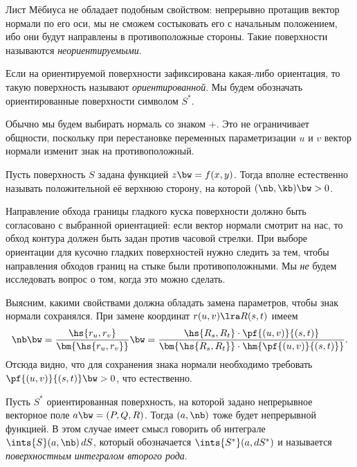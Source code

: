 \documentclass[a4paper]{article}
\begin{document}
\begin{ex}
Лист Мёбиуса не обладает подобным свойством: непрерывно протащив вектор нормали по его оси, мы не
сможем состыковать его с начальным положением, ибо они будут направлены в противоположные стороны.
Такие поверхности называются \emph{неориентируемыми}.
\end{ex}

\begin{df}
Если на ориентируемой поверхности зафиксирована какая-либо ориентация, то такую поверхность
называют \emph{ориентированной}. Мы будем обозначать ориентированные поверхности символом $S^*$.
\end{df}

Обычно мы будем выбирать нормаль со знаком $+$. Это не ограничивает общности, поскольку при перестановке
переменных параметризации $u$ и $v$ вектор нормали изменит знак на противоположный.

\begin{ex}
Пусть поверхность $S$ задана функцией $z \bw= f(x,y)$. Тогда вполне естественно называть положительной её
верхнюю сторону, на которой $(\nb, \kb) \bw> 0$.
\end{ex}

Направление обхода границы гладкого куска поверхности должно быть согласовано с выбранной ориентацией:
если вектор нормали смотрит на нас, то обход контура должен быть задан против часовой стрелки. При
выборе ориентации для кусочно гладких поверхностей нужно следить за тем, чтобы направления обходов границ
на стыке были противоположными. Мы \emph{не} будем исследовать вопрос о том, когда это можно сделать.

Выясним, какими свойствами должна обладать замена параметров, чтобы знак нормали сохранялся. При
замене координат $r(u,v) \lra R(s,t)$ имеем
$$
  \nb \bw= \frac{\hs{r_u, r_v}}{\bm{\hs{r_u, r_v}}} \bw=
  \frac{\hs{R_s, R_t}\cdot \pf{(u,v)}{(s,t)}}{\bm{\hs{R_s, R_t}}\cdot \hm{\pf{(u,v)}{(s,t)}}}.
$$
Отсюда видно, что для сохранения знака нормали необходимо требовать $\pf{(u,v)}{(s,t)} \bw> 0$, что естественно.

\begin{df}
Пусть $S^*$ ориентированная поверхность, на которой задано непрерывное векторное поле $a \bw= (P, Q, R)$.
Тогда $(a, \nb)$ тоже будет непрерывной функцией. В этом случае имеет смысл говорить об интеграле
$\ints{S}(a, \nb)\,d S$, который обозначается $\ints{S^*}(a, d S^*)$ и называется \emph{поверхностным
интегралом второго рода}.
\end{df}
\end{document}
